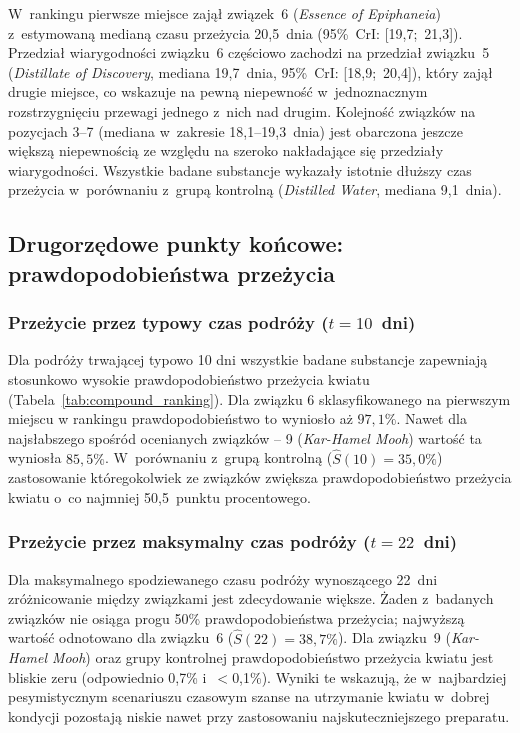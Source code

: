 \documentclass[12pt, a4paper]{article}
\begin{document}
\par W~rankingu pierwsze miejsce zajął związek~6 (\textit{Essence of 
Epiphaneia}) z~estymowaną medianą czasu przeżycia 20,5~dnia 
(95\%~CrI: [19,7;~21,3]). Przedział wiarygodności związku~6 częściowo 
zachodzi na przedział związku~5 (\textit{Distillate of Discovery}, 
mediana 19,7~dnia, 95\%~CrI: [18,9;~20,4]), który zajął drugie miejsce, 
co wskazuje na pewną niepewność w~jednoznacznym rozstrzygnięciu przewagi 
jednego z~nich nad drugim. Kolejność związków na pozycjach 3--7 (mediana 
w~zakresie 18,1--19,3~dnia) jest obarczona jeszcze większą niepewnością 
ze względu na szeroko nakładające się przedziały wiarygodności. Wszystkie badane substancje wykazały istotnie dłuższy czas przeżycia 
w~porównaniu z~grupą kontrolną (\textit{Distilled Water}, mediana 
9,1~dnia).

\subsection{Drugorzędowe punkty końcowe: prawdopodobieństwa przeżycia}

\subsubsection{Przeżycie przez typowy czas podróży ($t = 10$~dni)}

Dla podróży trwającej typowo 10 dni wszystkie badane substancje zapewniają stosunkowo wysokie prawdopodobieństwo przeżycia kwiatu (Tabela~\ref{tab:compound_ranking}). Dla związku 6 sklasyfikowanego na pierwszym miejscu w rankingu prawdopodobieństwo to wyniosło aż $97{,}1\%$. Nawet dla najsłabszego spośród ocenianych związków -- 9 (\textit{Kar-Hamel Mooh}) wartość ta wyniosła $85{,}5\%$. W~porównaniu z~grupą kontrolną ($\hat{S}(10) = 35{,}0\%$) zastosowanie któregokolwiek ze związków zwiększa prawdopodobieństwo przeżycia 
kwiatu o~co najmniej 50,5~punktu procentowego.

\subsubsection{Przeżycie przez maksymalny czas podróży ($t = 22$~dni)}

Dla maksymalnego spodziewanego czasu podróży wynoszącego 22~dni 
zróżnicowanie między związkami jest zdecydowanie większe. Żaden 
z~badanych związków nie osiąga progu 50\% prawdopodobieństwa przeżycia; 
najwyższą wartość odnotowano dla związku~6 ($\hat{S}(22) = 38{,}7\%$). 
Dla związku~9 (\textit{Kar-Hamel Mooh}) oraz grupy kontrolnej 
prawdopodobieństwo przeżycia kwiatu jest bliskie zeru (odpowiednio 
0,7\% i~$<$0,1\%). Wyniki te wskazują, że w~najbardziej pesymistycznym 
scenariuszu czasowym szanse na utrzymanie kwiatu w~dobrej kondycji 
pozostają niskie nawet przy zastosowaniu najskuteczniejszego preparatu.
\end{document}
